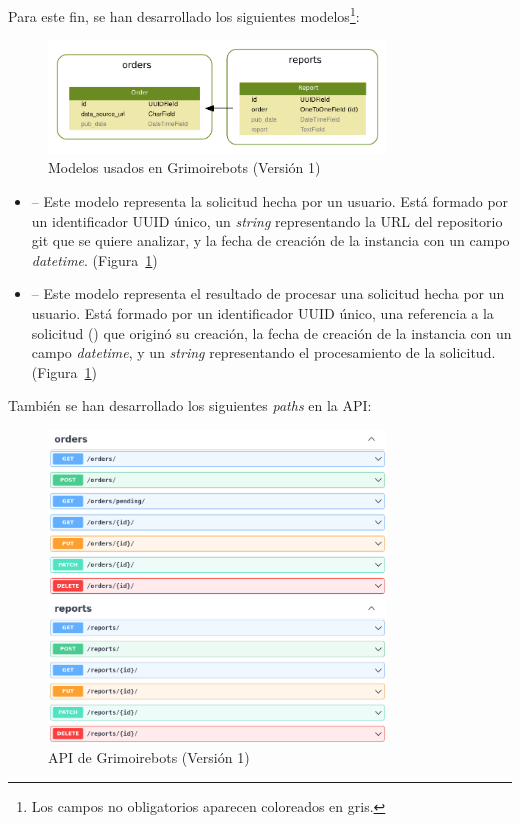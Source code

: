 Para este fin, se han desarrollado los siguientes modelos\footnote{Los campos no obligatorios aparecen coloreados en gris.}:

\begin{figure}[ht]
    \centering
    \includegraphics[width=0.8\textwidth]{Figures/grimoirebots_i_models}
    \decoRule
    \caption[Grimoirebots I (modelos)]{Modelos usados en Grimoirebots (Versión 1)}
    \label{fig:grimoirebots_i_models}
\end{figure}

\begin{itemize}
    \item {} -- Este modelo representa la solicitud hecha por un usuario. Está formado por un identificador UUID único, un \emph{string} representando la URL del repositorio git que se quiere analizar, y la fecha de creación de la instancia con un campo \emph{datetime}. (Figura~\ref{fig:grimoirebots_i_models})
    \item {} -- Este modelo representa el resultado de procesar una solicitud hecha por un usuario. Está formado por un identificador UUID único, una referencia a la solicitud () que originó su creación, la fecha de creación de la instancia con un campo \emph{datetime}, y un \emph{string} representando el procesamiento de la solicitud. (Figura~\ref{fig:grimoirebots_i_models})
\end{itemize}

También se han desarrollado los siguientes \emph{paths} en la API:

\begin{figure}[ht]
    \centering
    \includegraphics[width=0.8\textwidth]{Figures/grimoirebots_i_api}
    \decoRule
    \caption[Grimoirebots I (API)]{API de Grimoirebots (Versión 1)}
    \label{fig:grimoirebots_i_api}
\end{figure}

